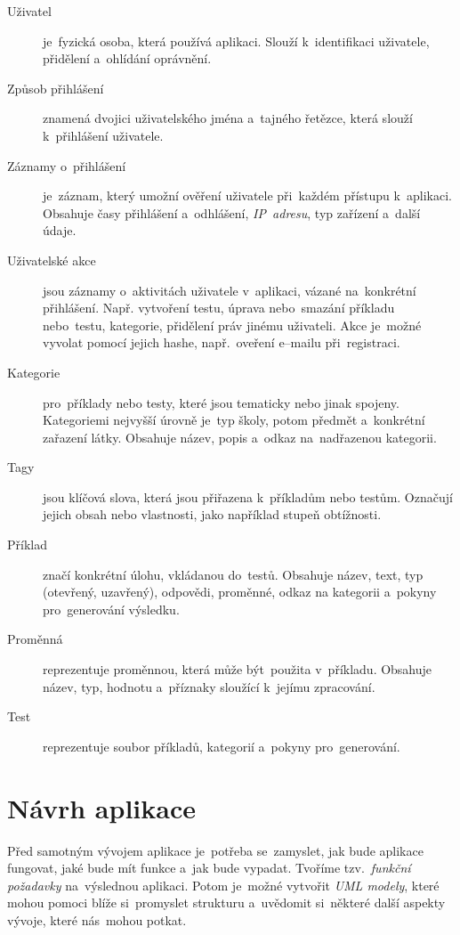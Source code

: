 \documentclass[11pt,a4paper]{report}
\begin{document}
                \begin{description}
                    \item[Uživatel] je~fyzická osoba, která používá aplikaci. Slouží k~identifikaci uživatele, přidělení a~ohlídání oprávnění.
                    \item[Způsob přihlášení] znamená dvojici uživatelského jména a~tajného řetězce, která slouží k~přihlášení uživatele.
                    \item[Záznamy o~přihlášení] je~záznam, který umožní ověření uživatele při~každém přístupu k~aplikaci. Obsahuje časy přihlášení a~odhlášení, \emph{IP~adresu}, typ zařízení a~další údaje.
                    \item[Uživatelské akce] jsou záznamy o~aktivitách uživatele v~aplikaci, vázané na~konkrétní přihlášení. Např. vytvoření testu, úprava nebo~smazání příkladu nebo~testu, kategorie, přidělení práv jinému uživateli. Akce je~možné vyvolat pomocí jejich hashe, např.~oveření e--mailu při~registraci.
                    \item[Kategorie] pro~příklady nebo testy, které jsou tematicky nebo jinak spojeny. Kategoriemi nejvyšší úrovně je~typ školy, potom předmět a~konkrétní zařazení látky. Obsahuje název, popis a~odkaz na~nadřazenou kategorii.
                    \item[Tagy] jsou klíčová slova, která jsou přiřazena k~příkladům nebo testům. Označují jejich obsah nebo vlastnosti, jako například stupeň obtížnosti.
                    \item[Příklad] značí konkrétní úlohu, vkládanou do~testů. Obsahuje název, text, typ (otevřený, uzavřený), odpovědi, proměnné, odkaz na kategorii a~pokyny pro~generování výsledku.
                    \item[Proměnná] reprezentuje proměnnou, která může být~použita v~příkladu. Obsahuje název, typ, hodnotu a~příznaky sloužící k~jejímu zpracování.
                    \item[Test] reprezentuje soubor příkladů, kategorií a~pokyny pro~generování.
                \end{description}

	\chapter{Návrh aplikace}
        Před samotným vývojem aplikace je~potřeba se~zamyslet, jak bude aplikace fungovat, jaké bude mít funkce a~jak bude vypadat. Tvoříme tzv.~\emph{funkční požadavky} na~výslednou aplikaci. Potom je~možné vytvořit \emph{UML modely}, které mohou pomoci blíže si~promyslet strukturu a~uvědomit si~některé další aspekty vývoje, které nás~mohou potkat.
\end{document}
